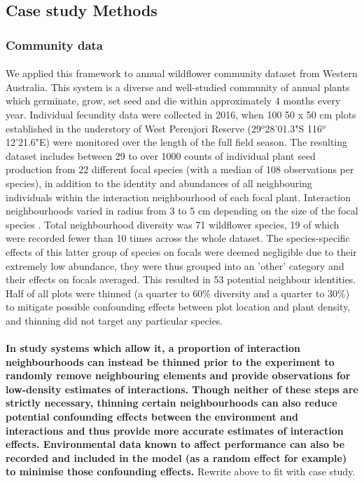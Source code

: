\documentclass[a4,12pt]{article}
\begin{document}
    \subsection{Case study Methods}
    \label{SI:casestudy}

        \subsubsection{Community data}

        \paragraph{}
        We applied this framework to annual wildflower community dataset from Western Australia. This system is a diverse and well-studied community of annual plants which germinate, grow, set seed and die within approximately 4 months every year. Individual fecundity data were collected in 2016, when 100 50 x 50 cm plots established in the understory of West Perenjori Reserve (29$^o$28'01.3"S 116$^o$12'21.6"E) were monitored over the length of the full field season. The resulting dataset includes between 29 to over 1000 counts of individual plant seed production from 22 different focal species (with a median of 108 observations per species), in addition to the identity and abundances of all neighbouring individuals within the interaction neighbourhood of each focal plant. Interaction neighbourhoods varied in radius from 3 to 5 cm depending on the size of the focal species \parencite{Martyn2020}. Total neighbourhood diversity was 71 wildflower species, 19 of which were recorded fewer than 10 times across the whole dataset. The species-specific effects of this latter group of species on focals were deemed negligible due to their extremely low abundance, they were thus grouped into an 'other' category and their effects on focals averaged. This resulted in 53 potential neighbour identities. Half of all plots were thinned (a quarter to 60\% diversity and a quarter to 30\%) to mitigate possible confounding effects between plot location and plant density, and thinning did not target any particular species. 

        \paragraph{}
    \textbf{In study systems which allow it, a proportion of interaction neighbourhoods can instead be thinned prior to the experiment to randomly remove neighbouring elements and provide observations for low-density estimates of interactions. Though neither of these steps are strictly necessary, thinning certain neighbourhoods can also reduce potential confounding effects between the environment and interactions and thus provide more accurate estimates of interaction effects. Environmental data known to affect performance can also be recorded and included in the model (as a random effect for example) to minimise those confounding effects.}
    Rewrite above to fit with case study.
\end{document}
